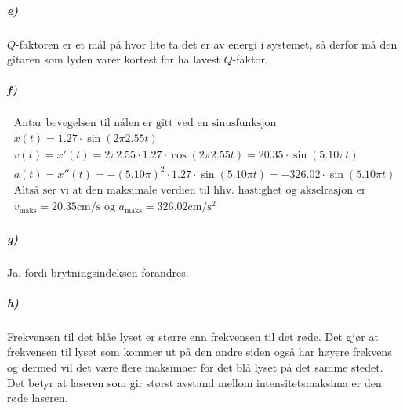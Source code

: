 \documentclass[11pt, A4paper,norsk]{article}
\begin{document}
			\subparagraph{e)}
				\begin{flushleft}
$Q$-faktoren er et mål på hvor lite ta det er av energi i systemet, så derfor må den gitaren som lyden varer kortest for ha lavest $Q$-faktor.
				\end{flushleft}









			\subparagraph{f)}
				\begin{gather*}
\text{Antar bevegelsen til nålen er gitt ved en sinusfunksjon} \\
x(t) = 1.27 \cdot \sin(2 \pi 2.55 t) \\
v(t) = x'(t) = 2 \pi 2.55 \cdot 1.27 \cdot \cos(2 \pi 2.55 t) = 20.35 \cdot \sin(5.10 \pi t) \\
a(t) = x''(t) = - (5.10 \pi)^2 \cdot 1.27 \cdot \sin(5.10 \pi t) = - 326.02 \cdot \sin(5.10 \pi t) \\
\text{Altså ser vi at den maksimale verdien til hhv. hastighet og akselrasjon er} \\
\text{$v_{\text{maks}} = 20.35 \text{cm$/$s}$ og $a_{\text{maks}} = 326.02 \text{cm$/$s$^2$}$}
				\end{gather*}












			\subparagraph{g)}
				\begin{flushleft}
Ja, fordi brytningsindeksen forandres.
				\end{flushleft}












			\subparagraph{h)}
				\begin{flushleft}
Frekvensen til det blåe lyset er større enn frekvensen til det røde. Det gjør at frekvensen til lyset som kommer ut på den andre siden også har høyere frekvens og dermed vil det være flere maksimaer for det blå lyset på det samme stedet. Det betyr at laseren som gir størst avstand mellom intensitetsmaksima er den røde laseren.
				\end{flushleft}
\end{document}
